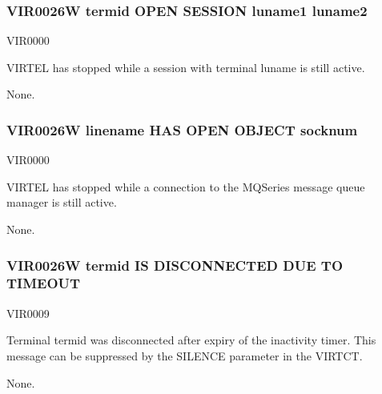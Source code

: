 \documentclass[letterpaper,10pt,english]{sphinxmanual}
\begin{document}
\subsubsection{VIR0026W termid OPEN SESSION luname1 \textendash{} luname2}
\label{\detokenize{messages:vir0026w-termid-open-session-luname1-luname2}}\begin{description}
\sphinxAtStartPar
VIR0000

\sphinxAtStartPar
VIRTEL has stopped while a session with terminal luname is still active.

\sphinxAtStartPar
None.

\end{description}


\subsubsection{VIR0026W linename HAS OPEN OBJECT socknum}
\label{\detokenize{messages:vir0026w-linename-has-open-object-socknum}}\begin{description}
\sphinxAtStartPar
VIR0000

\sphinxAtStartPar
VIRTEL has stopped while a connection to the MQSeries message queue manager is still active.

\sphinxAtStartPar
None.

\end{description}


\subsubsection{VIR0026W termid IS DISCONNECTED DUE TO TIME\sphinxhyphen{}OUT}
\label{\detokenize{messages:vir0026w-termid-is-disconnected-due-to-time-out}}\begin{description}
\sphinxAtStartPar
VIR0009

\sphinxAtStartPar
Terminal termid was disconnected after expiry of the inactivity timer. This message can be suppressed by the SILENCE parameter in the VIRTCT.

\sphinxAtStartPar
None.

\end{description}
\end{document}
